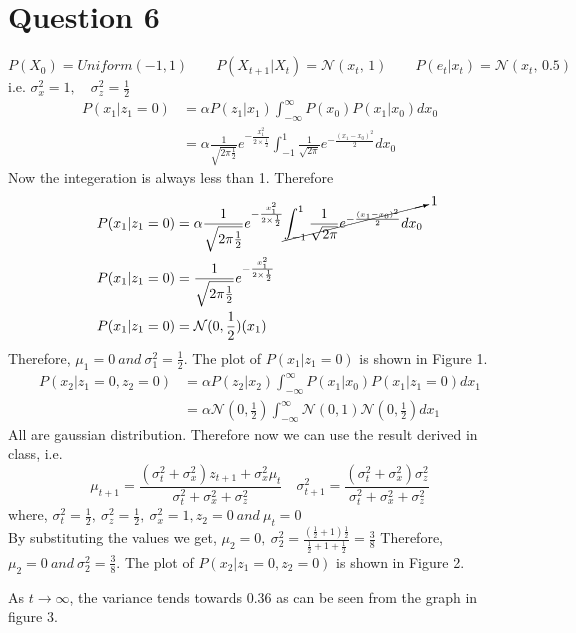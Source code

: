 \documentclass[letter, 9pt]{article}
\begin{document}
\section*{Question 6}
$P(X_0)=Uniform(-1,1) \qquad P(X_{t+1}|X_{t})=\mathcal{N}(x_t,\,1) \qquad P(e_t|x_t)=\mathcal{N}(x_t,\,0.5)$\\
i.e. $\sigma_x^2=1,\quad \sigma_z^2=\frac{1}{2}$\\
\begin{align*}
    P(x_1|z_1=0) & =\alpha P(z_1|x_1)\int_{-\infty}^{\infty}P(x_0)P(x_1|x_0) dx_0\\
    & = \alpha \frac{1}{\sqrt{2\pi\frac{1}{2}}}e^{-\frac{x_1^2}{2\times\frac{1}{2}}}\int_{-1}^{1}\frac{1}{\sqrt{2\pi}}e^{-\frac{(x_1-x_0)^2}{2}} dx_0
\end{align*}
Now the integeration is always less than 1. Therefore
\begin{align*}
P(x_1|z_1=0) & = \alpha \frac{1}{\sqrt{2\pi\frac{1}{2}}}e^{-\frac{x_1^2}{2\times\frac{1}{2}}}\cancelto{1}{\int_{-1}^{1}\frac{1}{\sqrt{2\pi}}e^{-\frac{(x_1-x_0)^2}{2}} dx_0}\\
P(x_1|z_1=0) & = \frac{1}{\sqrt{2\pi\frac{1}{2}}}e^{-\frac{x_1^2}{2\times\frac{1}{2}}}\\
P(x_1|z_1=0) & = \mathcal{N}(0,\frac{1}{2})(x_1)
\end{align*}
Therefore, $\mu_1=0\ and\ \sigma_1^2 = \frac{1}{2}$. The plot of $P(x_1|z_1=0)$ is shown in Figure 1.
\begin{align*}
    P(x_2|z_1=0, z_2=0) & =\alpha P(z_2|x_2)\int_{-\infty}^{\infty}P(x_1|x_0)P(x_1|z_1=0)dx_1\\
    & = \alpha \mathcal{N}(0,\frac{1}{2})\int_{-\infty}^{\infty}\mathcal{N}(0,1)\mathcal{N}(0,\frac{1}{2})dx_1
\end{align*}
All are gaussian distribution. Therefore now we can use the result derived in class, i.e.
\begin{equation*}
    \mu_{t+1} = \frac{(\sigma_t^2+\sigma_x^2)z_{t+1}+\sigma_x^2\mu_t}{\sigma_t^2+\sigma_x^2+\sigma_z^2} \quad \sigma_{t+1}^2=\frac{(\sigma_t^2+\sigma_x^2)\sigma_z^2}{\sigma_t^2+\sigma_x^2+\sigma_z^2}
\end{equation*}
where, $\sigma_t^2=\frac{1}{2},\ \sigma_z^2=\frac{1}{2},\ \sigma_x^2=1, z_2=0\ and\ \mu_t=0$\\
By substituting the values we get, $\mu_2=0,\ \sigma_2^2 = \frac{(\frac{1}{2}+1)\frac{1}{2}}{\frac{1}{2}+1+\frac{1}{2}} = \frac{3}{8}$
Therefore, $\mu_2=0\ and\ \sigma_2^2 = \frac{3}{8}$. The plot of $P(x_2|z_1=0, z_2=0)$ is shown in Figure 2.

As $t\rightarrow\infty$, the variance tends towards 0.36 as can be seen from the graph in figure 3.
\end{document}
